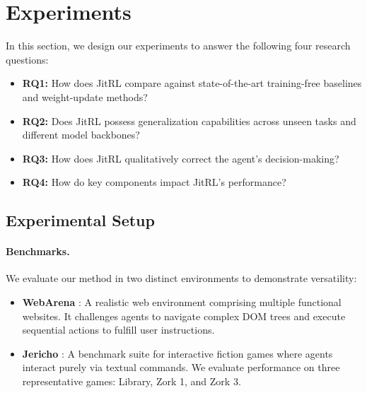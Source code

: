 \section{Experiments}

In this section, we design our experiments to answer the following four research questions:
\begin{itemize}[leftmargin=*,nosep]
    \item \textbf{RQ1:} How does JitRL compare against state-of-the-art training-free baselines and weight-update methods?
    \item \textbf{RQ2:} Does JitRL possess generalization capabilities across unseen tasks and different model backbones?
    \item \textbf{RQ3:}  How does JitRL qualitatively correct the agent's decision-making?
    \item \textbf{RQ4:} How do key components impact JitRL's performance?
\end{itemize}







\subsection{Experimental Setup}

\paragraph{Benchmarks.}
We evaluate our method in two distinct environments to demonstrate versatility:



\begin{itemize}[leftmargin=*,nosep]
    \item \textbf{WebArena} \citep{webarena}: A realistic web environment comprising multiple functional websites.
    It challenges agents to navigate complex DOM trees and execute sequential actions to fulfill user instructions.
    \item \textbf{Jericho} \citep{jericho}: A benchmark suite for interactive fiction games where agents interact purely via textual commands. 
    We evaluate performance on three representative games: Library, Zork 1, and Zork 3.
\end{itemize}
